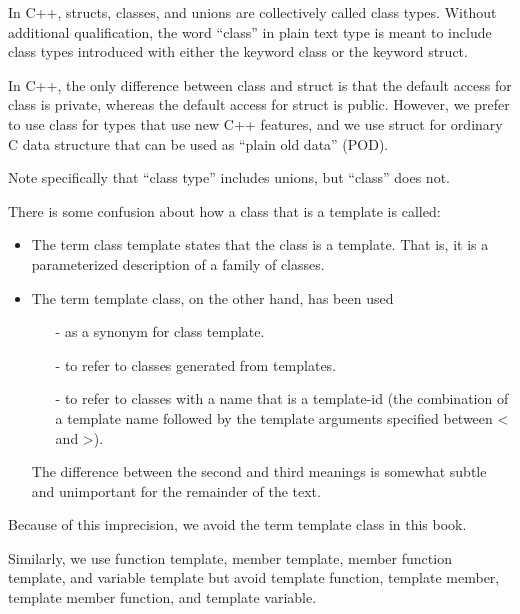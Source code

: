 In C++, structs, classes, and unions are collectively called class types. Without additional qualification, the word “class” in plain text type is meant to include class types introduced with either the keyword class or the keyword struct.

\begin{tcolorbox}[colback=webgreen!5!white,colframe=webgreen!75!black]
\hspace*{0.75cm}In C++, the only difference between class and struct is that the default access for class is private, whereas the default access for struct is public. However, we prefer to use class for types that use new C++ features, and we use struct for ordinary C data structure that can be used as “plain old data” (POD).
\end{tcolorbox}

Note specifically that “class type” includes unions, but “class” does not.

There is some confusion about how a class that is a template is called:

\begin{itemize}
\item 
The term class template states that the class is a template. That is, it is a parameterized description of a family of classes.

\item 
The term template class, on the other hand, has been used
\begin{itemize}
\item[-]
as a synonym for class template.

\item[-]
to refer to classes generated from templates.

\item[-]
to refer to classes with a name that is a template-id (the combination of a template name followed by the template arguments specified between < and >).
\end{itemize}

The difference between the second and third meanings is somewhat subtle and unimportant for the remainder of the text.
\end{itemize}

Because of this imprecision, we avoid the term template class in this book.

Similarly, we use function template, member template, member function template, and variable template but avoid template function, template member, template member function, and template variable.

